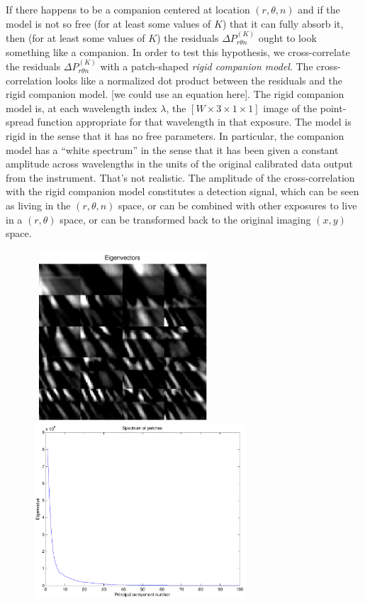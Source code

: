 \documentclass[12pt,pdftex,preprint]{aastex}
\begin{document}
If there happens to be a companion centered at location $(r, \theta,
n)$ and if the model is not so free (for at least some values of $K$)
that it can fully absorb it, then (for at least some values of $K$)
the residuals $\Delta P^{(K)}_{r \theta n}$ ought to look something
like a companion.  In order to test this hypothesis, we
cross-correlate the residuals $\Delta P^{(K)}_{r \theta n}$ with a
patch-shaped \emph{rigid companion model}.  The cross-correlation
looks like a normalized dot product between the residuals and the
rigid companion model.  [we could use an equation here].  The rigid
companion model is, at each wavelength index $\lambda$, the $[W\times
  3\times 1\times 1]$ image of the point-spread function appropriate
for that wavelength in that exposure.  The model is rigid in the sense
that it has no free parameters.  In particular, the companion model
has a ``white spectrum'' in the sense that it has been given a
constant amplitude across wavelengths in the units of the original
calibrated data output from the instrument.  That's not realistic.
The amplitude of the cross-correlation with the rigid companion model
constitutes a detection signal, which can be seen as living in the
$(r, \theta ,n)$ space, or can be combined with other exposures to
live in a $(r, \theta)$ space, or can be transformed back to the
original imaging $(x, y)$ space.

\begin{figure}[h!]
\begin{center}
\mbox{
\includegraphics[width=2.5in]{figs/eigenvectors.pdf}
\includegraphics[width=3.1in]{figs/spectrum.pdf}
}
\end{center}
\vspace{-7mm}
\caption{}
\label{fig:spectrum}
\end{figure}
 
\end{document}

